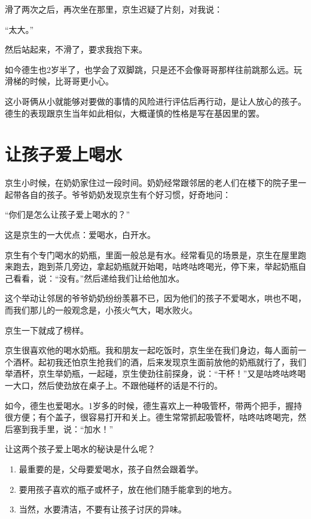 \documentclass[twoside,openright,headings=optiontohead]{ctexbook} %
\begin{document}
{滑了两次之后，再次坐在那里，京生迟疑了片刻，对我说：

``太大。''

然后站起来，不滑了，要求我抱下来。

如今德生也2岁半了，也学会了双脚跳，只是还不会像哥哥那样往前跳那么远。玩滑梯的时候，比哥哥更小心。

这小哥俩从小就能够对要做的事情的风险进行评估后再行动，是让人放心的孩子。德生的表现跟京生当年如此相似，大概谨慎的性格是写在基因里的罢。

\chapter*{让孩子爱上喝水}\label{water-drinking}

京生小时候，在奶奶家住过一段时间。奶奶经常跟邻居的老人们在楼下的院子里一起带各自的孩子。爷爷奶奶发现京生有个好习惯，好奇地问：

``你们是怎么让孩子爱上喝水的？''

这是京生的一大优点：爱喝水，白开水。

京生有个专门喝水的奶瓶，里面一般总是有水。经常看见的场景是，京生在屋里跑来跑去，跑到茶几旁边，拿起奶瓶就开始喝，咕咚咕咚喝光，停下来，举起奶瓶自己看看，说：``没有。''然后递给我们让给他加水。

这个举动让邻居的爷爷奶奶纷纷羡慕不已，因为他们的孩子不爱喝水，哄也不喝，而我们那儿的一般观念是，小孩火气大，喝水败火。

京生一下就成了榜样。

京生很喜欢他的喝水奶瓶。我和朋友一起吃饭时，京生坐在我们身边，每人面前一个酒杯。起初我还怕京生抢我们的酒，后来发现京生面前放他的奶瓶就行了，我们举酒杯，京生举奶瓶，一起碰，京生使劲往前探身，说：``干杯！''又是咕咚咕咚喝一大口，然后使劲放在桌子上。不跟他碰杯的话是不行的。

如今，德生也爱喝水。1岁多的时候，德生喜欢上一种吸管杯，带两个把手，握持很方便；有个盖子，很容易打开和关上。德生常常抓起吸管杯，咕咚咕咚喝完，然后塞到我手里，说：``加水！''

让这两个孩子爱上喝水的秘诀是什么呢？

\begin{enumerate}
\def\labelenumi{\arabic{enumi}.}
\item
  最重要的是，父母要爱喝水，孩子自然会跟着学。
\item
  要用孩子喜欢的瓶子或杯子，放在他们随手能拿到的地方。
\item
  当然，水要清洁，不要有让孩子讨厌的异味。
\end{enumerate}

}
\end{document}
